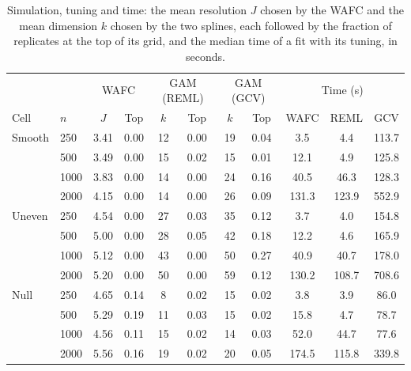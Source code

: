 \begin{table}[tp]
\caption{Simulation, tuning and time: the mean resolution $J$ chosen by the WAFC and the mean dimension $k$ chosen by the two splines, each followed by the fraction of replicates at the top of its grid, and the median time of a fit with its tuning, in seconds.}
\label{tab:sim-tuning}
\centering
\footnotesize
\setlength{\tabcolsep}{4pt}
\begin{tabular}{ll cc cc cc ccc}
\hline
 & & \multicolumn{2}{c}{WAFC} & \multicolumn{2}{c}{GAM (REML)} & \multicolumn{2}{c}{GAM (GCV)} & \multicolumn{3}{c}{Time (s)} \\
Cell & $n$ & $J$ & Top & $k$ & Top & $k$ & Top & WAFC & REML & GCV \\
\hline
Smooth & 250 & 3.41 & 0.00 & 12 & 0.00 & 19 & 0.04 & 3.5 & 4.4 & 113.7 \\
 & 500 & 3.49 & 0.00 & 15 & 0.02 & 15 & 0.01 & 12.1 & 4.9 & 125.8 \\
 & 1000 & 3.83 & 0.00 & 14 & 0.00 & 24 & 0.16 & 40.5 & 46.3 & 128.3 \\
 & 2000 & 4.15 & 0.00 & 14 & 0.00 & 26 & 0.09 & 131.3 & 123.9 & 552.9 \\
Uneven & 250 & 4.54 & 0.00 & 27 & 0.03 & 35 & 0.12 & 3.7 & 4.0 & 154.8 \\
 & 500 & 5.00 & 0.00 & 28 & 0.05 & 42 & 0.18 & 12.2 & 4.6 & 165.9 \\
 & 1000 & 5.12 & 0.00 & 43 & 0.00 & 50 & 0.27 & 40.9 & 40.7 & 178.0 \\
 & 2000 & 5.20 & 0.00 & 50 & 0.00 & 59 & 0.12 & 130.2 & 108.7 & 708.6 \\
Null & 250 & 4.65 & 0.14 & 8 & 0.02 & 15 & 0.02 & 3.8 & 3.9 & 86.0 \\
 & 500 & 5.29 & 0.19 & 11 & 0.03 & 15 & 0.02 & 15.8 & 4.7 & 78.7 \\
 & 1000 & 4.56 & 0.11 & 15 & 0.02 & 14 & 0.03 & 52.0 & 44.7 & 77.6 \\
 & 2000 & 5.56 & 0.16 & 19 & 0.02 & 20 & 0.05 & 174.5 & 115.8 & 339.8 \\
\hline
\end{tabular}
\end{table}

